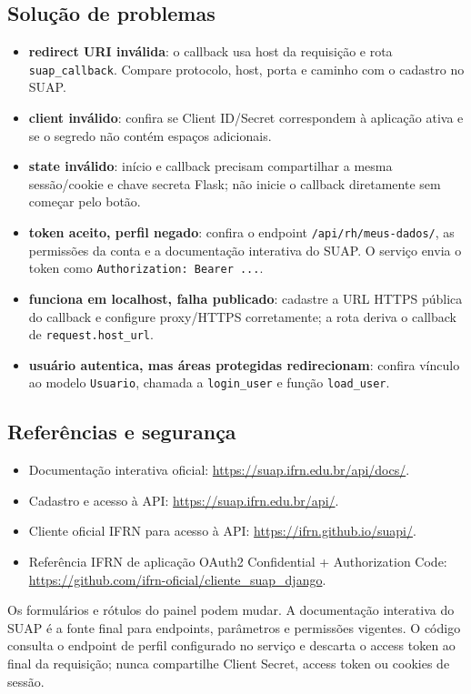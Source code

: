 \documentclass[11pt,a4paper]{article}
\begin{document}
\subsection{Solução de problemas}
\begin{itemize}
\item \textbf{redirect URI inválida}: o callback usa host da requisição e rota \texttt{suap\_callback}. Compare protocolo, host, porta e caminho com o cadastro no SUAP.
\item \textbf{client inválido}: confira se Client ID/Secret correspondem à aplicação ativa e se o segredo não contém espaços adicionais.
\item \textbf{state inválido}: início e callback precisam compartilhar a mesma sessão/cookie e chave secreta Flask; não inicie o callback diretamente sem começar pelo botão.
\item \textbf{token aceito, perfil negado}: confira o endpoint \texttt{/api/rh/meus-dados/}, as permissões da conta e a documentação interativa do SUAP. O serviço envia o token como \texttt{Authorization: Bearer ...}.
\item \textbf{funciona em localhost, falha publicado}: cadastre a URL HTTPS pública do callback e configure proxy/HTTPS corretamente; a rota deriva o callback de \texttt{request.host\_url}.
\item \textbf{usuário autentica, mas áreas protegidas redirecionam}: confira vínculo ao modelo \texttt{Usuario}, chamada a \texttt{login\_user} e função \texttt{load\_user}.
\end{itemize}

\subsection{Referências e segurança}
\begin{itemize}
\item Documentação interativa oficial: \url{https://suap.ifrn.edu.br/api/docs/}.
\item Cadastro e acesso à API: \url{https://suap.ifrn.edu.br/api/}.
\item Cliente oficial IFRN para acesso à API: \url{https://ifrn.github.io/suapi/}.
\item Referência IFRN de aplicação OAuth2 Confidential + Authorization Code: \url{https://github.com/ifrn-oficial/cliente_suap_django}.
\end{itemize}
Os formulários e rótulos do painel podem mudar. A documentação interativa do SUAP é a fonte final para endpoints, parâmetros e permissões vigentes. O código consulta o endpoint de perfil configurado no serviço e descarta o access token ao final da requisição; nunca compartilhe Client Secret, access token ou cookies de sessão.
\end{document}
